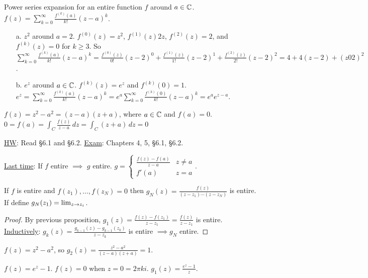 \documentclass[]{article}
\begin{document}
\begin{example}
	 Power series expansion for an entire function $f$ around $a\in\mathbb{C}$. $f(z) = \sum_{k=0}^\infty \frac{f^{(k)}(a)}{k!}(z-a)^k$.
	\begin{enumerate}
		\item[a.] $z^2$ around $a=2$. $f^{(0)}(z)= z^2$, $f^{(1)}(z)2z$, $f^{(2)}(z) = 2$, and $f^{(k)}(z) = 0$ for $k\geq 3$. So $\sum_{k=0}^\infty \frac{f^{(k)}(a)}{k!}(z-a)^k = \frac{f^{(0)}(z)}{0!}(z-2)^0 + \frac{f^{(1)}(z)}{1!}(z-2)^1 + \frac{f^{(2)}(z)}{2!}(z-2)^2 = 4 + 4(z-2) + (z02)^2$.
		\item[b.] $e^z$ around $a\in\mathbb{C}$. $f^{(k)} (z) = e^z$ and $f^{(k)}(0) = 1$. $e^z = \sum_{k=0}^\infty \frac{f^{(k)}(a)}{k!}(z-a)^k = e^a \sum_{k=0}^\infty \frac{f^{(k)}(0)}{k!}(z-a)^k = e^a e^{z-a}$.
	\end{enumerate}
\end{example}
\begin{example}
	$f(z) = z^2-a^2 = (z-a)(z+a)$, where $a\in\mathbb{C}$ and $f(a) = 0$. $0=f(a) = \int_C\frac{f(z)}{z-a} \, dz = \int_C(z+a) \, dz = 0 $
\end{example}
\underline{HW}: Read \S6.1 and \S6.2. \underline{Exam}: Chapters 4, 5, \S6.1, \S6.2.
\begin{recall}
	[Proposition] \underline{Last time}: If $f$ entire $\implies$ $g$ entire. $g = \begin{cases} \frac{f(z)-f(a)}{z-a} & z\neq a \\ f'(a) & z=a \end{cases}$.
\end{recall}
\begin{corollary}
	If $f$ is entire and $f(z_1),\dots,f(z_N) = 0$ then $g_N(z) = \frac{f(z)}{(z-z_1)\cdots(z-z_N)}$ is entire. If define $g_N(z_1) = \lim_{z\rightarrow z_i}$.
\end{corollary}
\begin{proof}
	By previous proposition, $g_1(z) = \frac{f(z)-f(z_1)}{z-z_1} = \frac{f(z)}{z-z_1}$ is entire. \underline{Inductively}: $g_k(z) = \frac{g_{k-1}(z) - g_{k-1}(z_k)}{z-z_k}$ is entire $\implies g_N$ entire.
\end{proof}
\begin{example}
	$f(z) = z^2-a^2$, so $g_2(z) = \frac{z^2-a^2}{(z-a)(z+a)} = 1$.
\end{example}
\begin{example}
	$f(z) = e^z-1$. $f(z) = 0$ when $z=0 = 2\pi k i$. $g_1(z) = \frac{e^z-1}{z}$.
\end{example}
\end{document}
